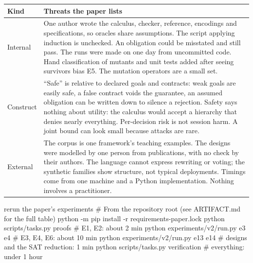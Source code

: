 \begin{center}
\renewcommand{\arraystretch}{1.25}
\begin{tabularx}{\textwidth}{@{}p{2.2cm}X@{}}
\toprule
\textbf{Kind} & \textbf{Threats the paper lists}\\
\midrule
Internal & One author wrote the calculus, checker, reference, encodings and specifications, so oracles share assumptions. The script applying induction is unchecked. An obligation could be misstated and still pass. The runs were made on one day from uncommitted code. Hand classification of mutants and unit tests added after seeing survivors bias E5. The mutation operators are a small set.\\
Construct & ``Safe'' is relative to declared goals and contracts: weak goals are easily safe, a false contract voids the guarantee, an assumed obligation can be written down to silence a rejection. Safety says nothing about utility: the calculus would accept a hierarchy that denies nearly everything. Per-decision risk is not session harm. A joint bound can look small because attacks are rare.\\
External & The corpus is one framework's teaching examples. The designs were modelled by one person from publications, with no check by their authors. The language cannot express rewriting or voting; the synthetic families show structure, not typical deployments. Timings come from one machine and a Python implementation. Nothing involves a practitioner.\\
\bottomrule
\end{tabularx}
\end{center}


\begin{tryit}{rerun the paper's experiments}
# From the repository root (see ARTIFACT.md for the full table)
python -m pip install -r requirements-paper.lock
python scripts/tasks.py proofs               # E1, E2: about 2 min
python experiments/v2/run.py e3 e4           # E3, E4, E6: about 10 min
python experiments/v2/run.py e13 e14         # designs and the SAT reduction: 1 min
python scripts/tasks.py verification         # everything: under 1 hour
\end{tryit}

